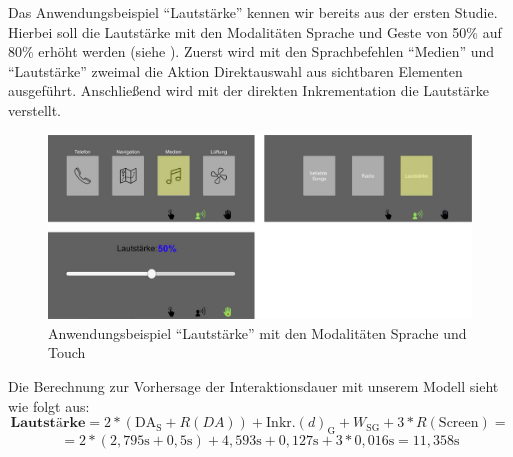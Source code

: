 Das Anwendungsbeispiel "`Lautstärke"' kennen wir bereits aus der ersten Studie. 
Hierbei soll die Lautstärke mit den Modalitäten Sprache und Geste von 50\% auf 80\% erhöht werden (siehe ). 
Zuerst wird mit den Sprachbefehlen "`Medien"' und "`Lautstärke"' zweimal die Aktion Direktauswahl aus sichtbaren Elementen ausgeführt. 
Anschließend wird mit der direkten Inkrementation die Lautstärke verstellt. 
\begin{figure}[ht]
	\centering
		\includegraphics[width=1\textwidth]{img/UseCases_Eval_MedienS.jpg}
	\caption{Anwendungsbeispiel "`Lautstärke"' mit den Modalitäten Sprache und Touch}
	\label{fig:UseCasesEvalMedienS}
\end{figure}
Die Berechnung zur Vorhersage der Interaktionsdauer mit unserem Modell sieht wie folgt aus:
\[
\textbf{Lautstärke} = 2*(\text{DA}_\text{S} + R(DA)) + \text{Inkr.} (d)_\text{G} + W_\text{SG} + 3*R(\text{Screen}) =
\]
\[
= 2*( 2,795\text{s} + 0,5\text{s}) + 4,593\text{s} + 0,127\text{s} + 3*0,016\text{s} = 11,358 \text{s}
\]

